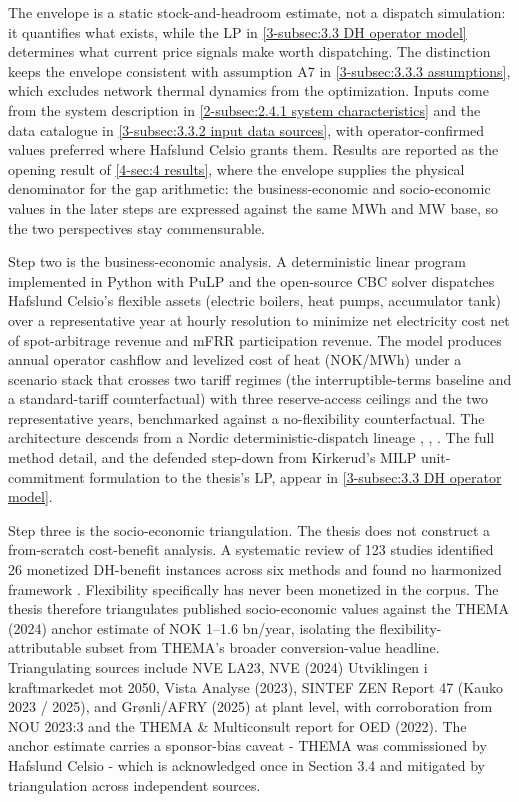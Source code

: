 The envelope is a static stock-and-headroom estimate, not a dispatch simulation: it quantifies what exists, while the LP in \autoref{3-subsec:3.3 DH operator model} determines what current price signals make worth dispatching. The distinction keeps the envelope consistent with assumption A7 in \autoref{3-subsec:3.3.3 assumptions}, which excludes network thermal dynamics from the optimization. Inputs come from the system description in \autoref{2-subsec:2.4.1 system characteristics} and the data catalogue in \autoref{3-subsec:3.3.2 input data sources}, with operator-confirmed values preferred where Hafslund Celsio grants them. Results are reported as the opening result of \autoref{4-sec:4 results}, where the envelope supplies the physical denominator for the gap arithmetic: the business-economic and socio-economic values in the later steps are expressed against the same MWh and MW base, so the two perspectives stay commensurable.

Step two is the business-economic analysis. A deterministic linear program implemented in Python with PuLP and the open-source CBC solver dispatches Hafslund Celsio's flexible assets (electric boilers, heat pumps, accumulator tank) over a representative year at hourly resolution to minimize net electricity cost net of spot-arbitrage revenue and mFRR participation revenue. The model produces annual operator cashflow and levelized cost of heat (NOK/MWh) under a scenario stack that crosses two tariff regimes (the interruptible-terms baseline and a standard-tariff counterfactual) with three reserve-access ceilings and the two representative years, benchmarked against a no-flexibility counterfactual. The architecture descends from a Nordic deterministic-dispatch lineage \cite{kirkerud_impacts_2016}, \cite{johannsen_incentivising_2021}, \cite{tromborg_flexible_2017}. The full method detail, and the defended step-down from Kirkerud's MILP unit-commitment formulation to the thesis's LP, appear in \autoref{3-subsec:3.3 DH operator model}.

Step three is the socio-economic triangulation. The thesis does not construct a from-scratch cost-benefit analysis. A systematic review of 123 studies identified 26 monetized DH-benefit instances across six methods and found no harmonized framework \cite{ahmed_district_2025}. Flexibility specifically has never been monetized in the corpus. The thesis therefore triangulates published socio-economic values against the THEMA (2024) anchor estimate of NOK 1–1.6 bn/year, isolating the flexibility-attributable subset from THEMA's broader conversion-value headline. Triangulating sources include NVE LA23, NVE (2024) Utviklingen i kraftmarkedet mot 2050, Vista Analyse (2023), SINTEF ZEN Report 47 (Kauko 2023 / 2025), and Grønli/AFRY (2025) at plant level, with corroboration from NOU 2023:3 and the THEMA \& Multiconsult report for OED (2022). The anchor estimate carries a sponsor-bias caveat - THEMA was commissioned by Hafslund Celsio - which is acknowledged once in Section 3.4 and mitigated by triangulation across independent sources.

